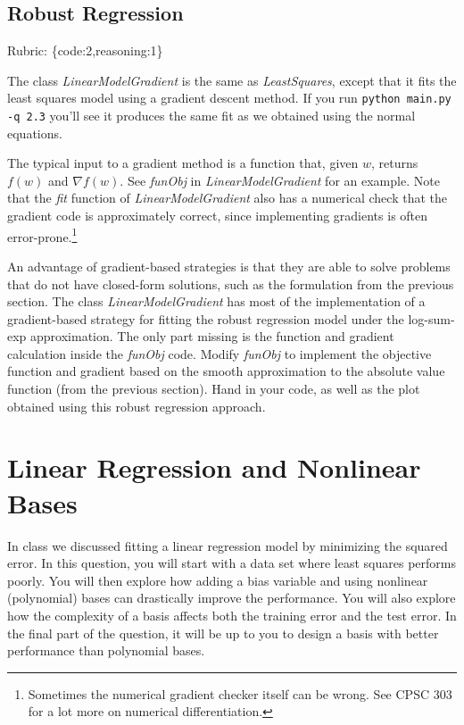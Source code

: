 \documentclass{article}
\def\rubric#1{\gre{Rubric: \{#1\}}}{}
\def\blu#1{{\color{blu}#1}}
\def\gre#1{{\color{gre}#1}}
\begin{document}
\subsection{Robust Regression}
\rubric{code:2,reasoning:1}

The class \emph{LinearModelGradient} is the same as \emph{LeastSquares}, except that it fits the least squares model using a gradient descent method. If you run \verb|python main.py -q 2.3| you'll see it produces the same fit as we obtained using the normal equations.

The typical input to a gradient method is a function that, given $w$, returns $f(w)$ and $\nabla f(w)$. See \emph{funObj} in \emph{LinearModelGradient} for an example. Note that the \emph{fit} function of \emph{LinearModelGradient} also has a numerical check that the gradient code is approximately correct, since implementing gradients is often error-prone.\footnote{Sometimes the numerical gradient checker itself can be wrong. See CPSC 303 for a lot more on numerical differentiation.}

An advantage of gradient-based strategies is that they are able to solve
problems that do not have closed-form solutions, such as the formulation from the
previous section. The class \emph{LinearModelGradient} has most of the implementation
of a gradient-based strategy for fitting the robust regression model under the log-sum-exp approximation.
The only part missing is the function and gradient calculation inside the \emph{funObj} code.
\blu{Modify \emph{funObj} to implement the objective function and gradient based on the smooth
approximation to the absolute value function (from the previous section). Hand in your code, as well
as the plot obtained using this robust regression approach.}


\section{Linear Regression and Nonlinear Bases}

In class we discussed fitting a linear regression model by minimizing the squared error.
In this question, you will start with a data set where least squares performs poorly.
You will then explore how adding a bias variable and using nonlinear (polynomial) bases can drastically improve the performance.
You will also explore how the complexity of a basis affects both the training error and the test error.
In the final part of the question, it will be up to you to design a basis with better performance than polynomial bases.
\end{document}
